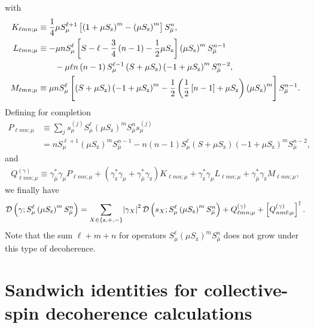 \documentclass[aps,11pt,notitlepage,nofootinbib,longbibliography]{revtex4-1}
\newcommand{\f}[2]{\dfrac{#1}{#2}} %
\newcommand{\p}[1]{\left(#1\right)} %
\renewcommand{\sp}[1]{\left[#1\right]} %
\renewcommand{\set}[1]{\left\{#1\right\}} %
\newcommand{\D}{\mathcal{D}}
\newcommand{\z}{\text{z}}
\newcommand{\bmu}{{\bar\mu}}
\newcommand{\1}{\mathds{1}}
\begin{document}
with
\begin{align}
  K_{\ell mn;\mu}
  &\equiv \f14 \mu S_\mu^{\ell+1}
  \sp{\p{1+\mu S_\z}^m-\p{\mu S_\z}^m} S_\bmu^n, \\
  L_{\ell mn;\mu}
  &\equiv -\mu n S_\mu^\ell \sp{S-\ell-\f34\p{n-1}-\f12\mu S_\z}
  \p{\mu S_\z}^m S_\bmu^{n-1} \notag \\
  &\qquad - \mu\ell n\p{n-1} S_\mu^{\ell-1}
  \p{S+\mu S_\z} \p{-1+\mu S_\z}^m S_\bmu^{n-2}, \\
  M_{\ell mn;\mu}
  &\equiv \mu n S_\mu^\ell \sp{\p{S+\mu S_\z}\p{-1+\mu S_\z}^m
    - \f12\p{\f12\sp{n-1}+\mu S_\z}\p{\mu S_\z}^m} S_\bmu^{n-1}.
\end{align}
Defining for completion
\begin{align}
  P_{\ell mn;\mu}
  &\equiv \sum_j s_\mu^{(j)} S_\mu^\ell
  \p{\mu S_\z}^m S_\bmu^n s_\mu^{(j)} \\
  &= n S_\mu^{\ell+1} \p{\mu S_\z}^m S_\bmu^{n-1}
  - n\p{n-1} S_\mu^\ell \p{S+\mu S_\z} \p{-1+\mu S_\z}^m S_\bmu^{n-2},
\end{align}
and
\begin{align}
  Q_{\ell mn;\mu}^{(\gamma)}
  \equiv \gamma_\bmu^* \gamma_\mu P_{\ell mn;\mu}
  + \p{\gamma_\z^* \gamma_\mu + \gamma_\bmu^* \gamma_\z}
  K_{\ell mn;\mu}
  + \gamma_\z^* \gamma_\mu L_{\ell mn;\mu}
  + \gamma_\bmu^* \gamma_\z M_{\ell mn;\mu},
  \label{eq:Q_single}
\end{align}
we finally have
\begin{align}
  \D\p{\gamma; S_\mu^\ell \p{\mu S_\z}^m S_\bmu^n}
  = \sum_{X\in\set{\z,+,-}} \abs{\gamma_X}^2
  \D\p{s_X; S_\mu^\ell \p{\mu S_\z}^m S_\bmu^n}
  + Q_{\ell mn;\mu}^{(\gamma)} + \sp{Q_{nm\ell;\mu}^{(\gamma)}}^\dag.
\end{align}
Note that the sum $\ell+m+n$ for operators
$S_\mu^\ell \p{\mu S_\z}^m S_\bmu^n$ does not grow under this type of
decoherence.


\section{Sandwich identities for collective-spin decoherence
  calculations}
\label{sec:sandwich_collective}
\end{document}
